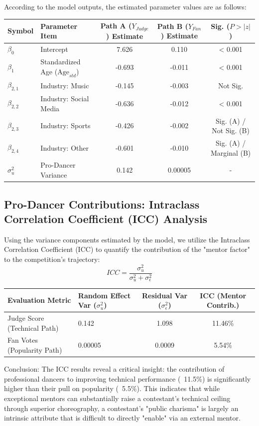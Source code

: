\documentclass[12pt]{article}
\begin{document}
	According to the model outputs, the estimated parameter values are as follows:
	\begin{table}[htbp]
		\centering
		\small
		\begin{tabularx}{\linewidth}{lXccc}
			\toprule
			Symbol & Parameter Item & Path A ($Y_{Judge}$) Estimate & Path B ($Y_{Fan}$) Estimate & Sig. ($P > |z|$) \\
			\midrule
			$\beta_0$ & Intercept & 7.626 & 0.110 & < 0.001 \\
			$\beta_1$ & Standardized Age ($\text{Age}_{std}$) & -0.693 & -0.011 & < 0.001 \\
			$\beta_{2,1}$ & Industry: Music & -0.145 & -0.003 & Not Sig. \\
			$\beta_{2,2}$ & Industry: Social Media & -0.636 & -0.012 & < 0.001 \\
			$\beta_{2,3}$ & Industry: Sports & -0.426 & -0.002 & Sig. (A) / Not Sig. (B) \\
			$\beta_{2,4}$ & Industry: Other & -0.601 & -0.010 & Sig. (A) / Marginal (B) \\
			$\sigma^2_u$ & Pro-Dancer Variance & 0.142 & 0.00005 & - \\
			\bottomrule
		\end{tabularx}
	\end{table}
	
	\subsection{Pro-Dancer Contributions: Intraclass Correlation Coefficient (ICC) Analysis}
	Using the variance components estimated by the model, we utilize the Intraclass Correlation Coefficient (ICC) to quantify the contribution of the "mentor factor" to the competition's trajectory: 
	$$ICC = \frac{\sigma^2_u}{\sigma^2_u + \sigma^2_\epsilon}$$
	\begin{table}[htbp]
		\centering
		\small
		\begin{tabularx}{\linewidth}{lXcc}
			\toprule
			Evaluation Metric & Random Effect Var ($\sigma^2_u$) & Residual Var ($\sigma^2_\epsilon$) & ICC (Mentor Contrib.) \\
			\midrule
			Judge Score (Technical Path) & 0.142 & 1.098 & 11.46\% \\
			Fan Votes (Popularity Path) & 0.00005 & 0.0009 & 5.54\% \\
			\bottomrule
		\end{tabularx}
	\end{table}
	Conclusion: The ICC results reveal a critical insight: the contribution of professional dancers to improving technical performance (~11.5\%) is significantly higher than their pull on popularity (~5.5\%). This indicates that while exceptional mentors can substantially raise a contestant's technical ceiling through superior choreography, a contestant's "public charisma" is largely an intrinsic attribute that is difficult to directly "enable" via an external mentor.
	
\end{document}
